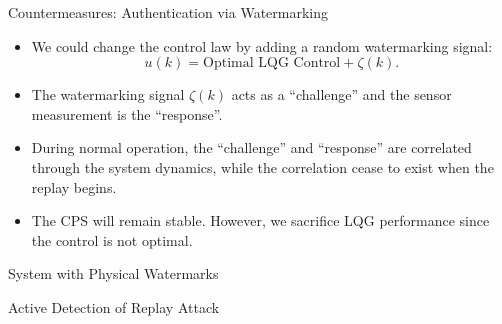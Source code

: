\documentclass[10pt]{beamer}
\newlength\figureheight
\newlength\figurewidth
\newcommand{\tikzdir}[1]{#1.tikz}
\newcommand{\inputtikz}[1]{}}
\begin{document}
  \begin{frame}{Countermeasures: Authentication via Watermarking}
    \begin{itemize}
      \item We could change the control law by adding a random watermarking signal:
	\begin{displaymath}
	  u(k) = \text{Optimal LQG Control}+ \zeta(k).
	\end{displaymath}
      \item The watermarking signal $\zeta(k)$ acts as a ``challenge'' and the sensor measurement is the ``response''. 
      \item During normal operation, the ``challenge'' and ``response'' are correlated through the system dynamics, while the correlation cease to exist when the replay begins.
      \item The CPS will remain stable. However, we sacrifice LQG performance since the control is not optimal.
    \end{itemize}
  \end{frame}

\begin{frame}{System with Physical Watermarks}
    \begin{figure}[htpb]
      \begin{center}
	\inputtikz{replaywithphywatermark}
      \end{center}
    \end{figure}
\end{frame}

\begin{frame}{Active Detection of Replay Attack}
  \setlength{\figureheight}{6cm}
  \setlength{\figurewidth}{7cm}
    \begin{figure}[htpb]
      \begin{center}
	\inputtikz{replay1}
      \end{center}
    \end{figure}
\end{frame}
\end{document}
